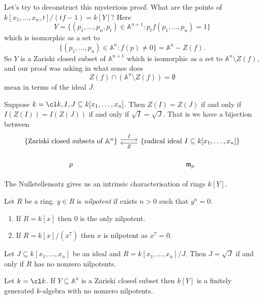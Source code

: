 \documentclass[a4paper]{article}
\renewcommand{\A}{\mathbb{A}}
\begin{document}
\begin{remark}
  Let's try to deconstruct this mysterious proof. What are the points of \(k[x_1, \dots, x_n, t]/(tf - 1) = k[Y]\)? Here
  \[
    Y = \{(p_1, \dots, p_n, p_t) \in \A^{n + 1}: p_t f(p_1, \dots, p_n) = 1\}
  \]
  which is isomorphic as a set to
  \[
    \{(p_1, \dots, p_n) \in \A^n: f(p) \neq 0\} = \A^n - Z(f).
  \]
  So \(Y\) is a Zariski closed subset of \(\A^{n + 1}\) which is isomorphic as a set to \(\A^n \setminus Z(f)\), and our proof was asking in what sense does
  \[
    Z(f) \cap (\A^n \setminus Z(f)) = \emptyset
  \]
  mean in terms of the ideal \(J\).
\end{remark}

\begin{corollary}
  Suppose \(k = \cl k, I, J \subseteq k[x_1, \dots, x_n]\). Then \(Z(I) = Z(J)\) if and only if \(I(Z(I)) = I(Z(J))\) if and only if \(\sqrt I = \sqrt J\). That is we have a bijection between
  \[
    \begin{tikzcd}
      \{\text{Zariski closed subsets of } \A^n\} \ar[r, "I", shift left] & \{\text{radical ideal } I \subseteq k[x_1, \dots, x_n]\} \ar[l, "Z", shift left] \\
      p & \mathfrak m_p
    \end{tikzcd}
  \]
\end{corollary}

The Nullstellensatz gives us an intrinsic characterisation of rings \(k[Y]\).

\begin{definition}[nilpotent]
  Let \(R\) be a ring. \(y \in R\) is \emph{nilpotent} if exists \(n > 0\) such that \(y^n = 0\).
\end{definition}

\begin{eg}\leavevmode
  \begin{enumerate}
  \item If \(R = k[x]\) then \(0\) is the only nilpotent.
  \item If \(R = k[x]/(x^7)\) then \(x\) is nilpotent as \(x^7 = 0\).
  \end{enumerate}
\end{eg}

\begin{ex}
  Let \(J \subseteq k[x_1, \dots, x_n]\) be an ideal and \(R = k[x_1, \dots, x_n]/J\). Then \(J = \sqrt J\) if and only if \(R\) has no nonzero nilpotents.
\end{ex}

\begin{corollary}
  Let \(k = \cl k\). If \(Y \subseteq \A^n\) is a Zariski closed subset then \(k[Y]\) is a finitely generated \(k\)-algebra with no nonzero nilpotents.
\end{corollary}
\end{document}
